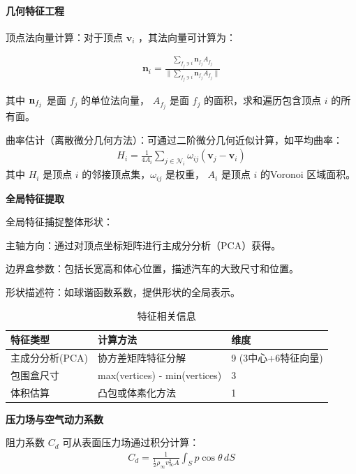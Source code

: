 \documentclass{MMCStyle}
\begin{document}
    \paragraph{几何特征工程}


    顶点法向量计算：对于顶点 $\mathbf{v}_{i}$ ，其法向量可计算为：  

    \begin{eqnarray} 
    \mathbf{n}_{i}=\frac{\sum_{f_{j}\ni i}\mathbf{n}_{f_{j}}A_{f_{j}}}{\|\sum_{f_{j}\ni i}\mathbf{n}_{f_{j}}A_{f_{j}}\|}
    \end{eqnarray}

其中 ${\bf n}_{f_{j}}$ 是面 $f_{j}$ 的单位法向量， $A_{f_{j}}$ 是面 $f_{j}$ 的面积，求和遍历包含顶点 $i$ 的所有面。    

曲率估计（离散微分几何方法）：可通过二阶微分几何近似计算，如平均曲率：      \begin{eqnarray} 
    H_{i}=\frac{1}{4A_{i}}\sum_{j\in\mathcal{N}_{i}}\omega_{i j}(\mathbf{v}_{j}-\mathbf{v}_{i})
    \end{eqnarray}
其中 $H_{i}$ 是顶点 $i$ 的邻接顶点集，$\omega_{i j}$ 是权重， $A_{i}$ 是顶点 $i$ 的Voronoi 区域面积。

\textbf{全局特征提取}

全局特征捕捉整体形状：

主轴方向：通过对顶点坐标矩阵进行主成分分析（PCA）获得。

 边界盒参数：包括长宽高和体心位置，描述汽车的大致尺寸和位置。
 
 形状描述符：如球谐函数系数，提供形状的全局表示。

 \begin{table}[H]
\centering
\begin{tabular}{|l|l|l|}
\hline
特征类型 & 计算方法 & 维度 \\
\hline
主成分分析(PCA) & 协方差矩阵特征分解 & 9 (3中心+6特征向量) \\
\hline
包围盒尺寸 & max(vertices) - min(vertices) & 3 \\
\hline
体积估算 & 凸包或体素化方法 & 1 \\
\hline
\end{tabular}
\caption{特征相关信息}
\label{tab:feature_info}
\end{table}

\textbf{压力场与空气动力系数}

阻力系数 $C_{d}$ 可从表面压力场通过积分计算：  
    \begin{eqnarray} 
    C_{d}=\frac{1}{\frac{1}{2}\rho_{\infty}v_{\infty}^{2}A}\int_{S}p\cos{\theta}\,d S
    \end{eqnarray}
\end{document}
